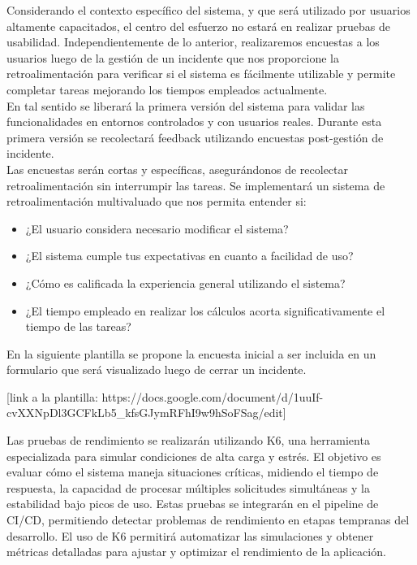Considerando el contexto específico del sistema, y que será utilizado por usuarios altamente capacitados, el centro del esfuerzo no estará 
en realizar pruebas de usabilidad. Independientemente de lo anterior, realizaremos encuestas a los usuarios luego de la gestión de un incidente 
que nos proporcione la retroalimentación para verificar si el sistema es fácilmente utilizable y permite completar tareas mejorando los tiempos 
empleados actualmente.\\
En tal sentido se liberará la primera versión del sistema para validar las funcionalidades en entornos controlados y con usuarios reales. Durante 
esta primera versión se recolectará feedback utilizando encuestas post-gestión de incidente.\\
Las encuestas serán cortas y específicas, asegurándonos de recolectar retroalimentación sin interrumpir las tareas. Se implementará un sistema de 
retroalimentación multivaluado que nos permita entender si:

\begin{itemize}
    \item ¿El usuario considera necesario modificar el sistema?
    \item ¿El sistema cumple tus expectativas en cuanto a facilidad de uso?
    \item ¿Cómo es calificada la experiencia general utilizando el sistema?
    \item ¿El tiempo empleado en realizar los cálculos acorta significativamente el tiempo de las tareas?
\end{itemize}

En la siguiente plantilla se propone la encuesta inicial a ser incluida en un formulario que será visualizado luego de cerrar un incidente.

[link a la plantilla: https://docs.google.com/document/d/1uuIf-cvXXNpDl3GCFkLb5_kfsGJymRFhI9w9hSoFSag/edit]


Las pruebas de rendimiento se realizarán utilizando K6, una herramienta especializada para simular condiciones de alta carga y estrés. El objetivo 
es evaluar cómo el sistema maneja situaciones críticas, midiendo el tiempo de respuesta, la capacidad de procesar múltiples solicitudes simultáneas y 
la estabilidad bajo picos de uso. Estas pruebas se integrarán en el pipeline de CI/CD, permitiendo detectar problemas de rendimiento en etapas tempranas 
del desarrollo. El uso de K6 permitirá automatizar las simulaciones y obtener métricas detalladas para ajustar y optimizar el rendimiento de la aplicación.

